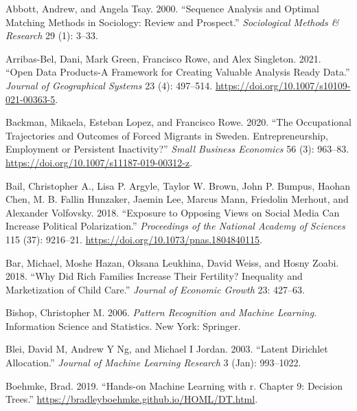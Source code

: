 \documentclass[
  letterpaper,
  DIV=11,
  numbers=noendperiod]{scrreprt}
\newlength{\cslhangindent}
\newlength{\cslentryspacingunit} %
\newenvironment{CSLReferences}[2] %
 {%
  \setlength{\parindent}{0pt}
  \ifodd #1
  \let\oldpar\par
  \def\par{\hangindent=\cslhangindent\oldpar}
  \fi
  \setlength{\parskip}{#2\cslentryspacingunit}
 }%
 {}
\begin{document}

\hypertarget{refs}{}
\begin{CSLReferences}{1}{0}
\leavevmode{}%
Abbott, Andrew, and Angela Tsay. 2000. {``Sequence Analysis and Optimal
Matching Methods in Sociology: Review and Prospect.''}
\emph{Sociological Methods \& Research} 29 (1): 3--33.

\leavevmode{}%
Arribas-Bel, Dani, Mark Green, Francisco Rowe, and Alex Singleton. 2021.
{``Open Data Products-A Framework for Creating Valuable Analysis Ready
Data.''} \emph{Journal of Geographical Systems} 23 (4): 497--514.
\url{https://doi.org/10.1007/s10109-021-00363-5}.

\leavevmode{}%
Backman, Mikaela, Esteban Lopez, and Francisco Rowe. 2020. {``The
Occupational Trajectories and Outcomes of Forced Migrants in Sweden.
Entrepreneurship, Employment or Persistent Inactivity?''} \emph{Small
Business Economics} 56 (3): 963--83.
\url{https://doi.org/10.1007/s11187-019-00312-z}.

\leavevmode{}%
Bail, Christopher A., Lisa P. Argyle, Taylor W. Brown, John P. Bumpus,
Haohan Chen, M. B. Fallin Hunzaker, Jaemin Lee, Marcus Mann, Friedolin
Merhout, and Alexander Volfovsky. 2018. {``Exposure to Opposing Views on
Social Media Can Increase Political Polarization.''} \emph{Proceedings
of the National Academy of Sciences} 115 (37): 9216--21.
\url{https://doi.org/10.1073/pnas.1804840115}.

\leavevmode{}%
Bar, Michael, Moshe Hazan, Oksana Leukhina, David Weiss, and Hosny
Zoabi. 2018. {``Why Did Rich Families Increase Their Fertility?
Inequality and Marketization of Child Care.''} \emph{Journal of Economic
Growth} 23: 427--63.

\leavevmode{}%
Bishop, Christopher M. 2006. \emph{Pattern Recognition and Machine
Learning}. Information Science and Statistics. New York: Springer.

\leavevmode{}%
Blei, David M, Andrew Y Ng, and Michael I Jordan. 2003. {``Latent
Dirichlet Allocation.''} \emph{Journal of Machine Learning Research} 3
(Jan): 993--1022.

\leavevmode{}%
Boehmke, Brad. 2019. {``Hands-on Machine Learning with r. Chapter 9:
Decision Trees.''} \url{https://bradleyboehmke.github.io/HOML/DT.html}.


\end{CSLReferences}
\end{document}
